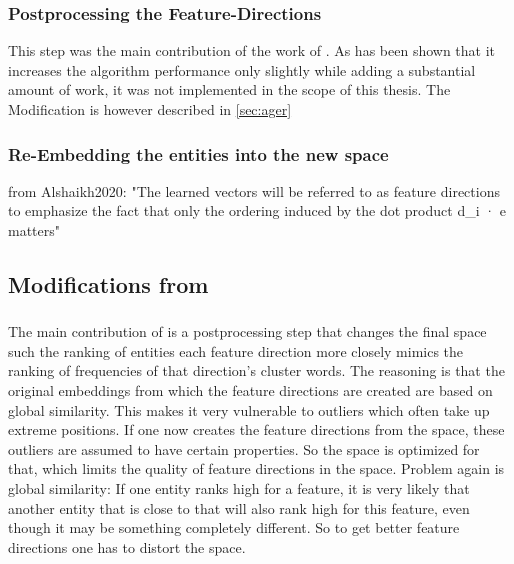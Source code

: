 \subsubsection{Postprocessing the Feature-Directions}
\label{sec:algo:postprocess}

This step was the main contribution of the work of \textcite{Ager2018}. As has been shown that it increases the algorithm performance only slightly while adding a substantial amount of work, it was not implemented in the scope of this thesis. The Modification is however described in \autoref{sec:ager}

\subsubsection{Re-Embedding the entities into the new space}
\label{sec:algo:reembed}

from Alshaikh2020: "The learned vectors will be referred to as feature directions to emphasize the fact that only the ordering induced by the dot product d_i · e matters"







\subsection{Modifications from \textcite{Ager2018,Alshaikh2020}}

\subsubsection{\textcite{Ager2018}}
\label{sec:ager}


The main contribution of \textcite{Ager2018} is a postprocessing step that changes the final space such the ranking of entities \wrt each feature direction more closely mimics the ranking of frequencies of that direction's cluster words. The reasoning is that the original embeddings from which the feature directions are created are based on global similarity. This makes it very vulnerable to outliers which often take up extreme positions. If one now creates the feature directions from the space, these outliers are assumed to have certain properties. So the space is optimized for that, which limits the quality of feature directions in the space. Problem again is global similarity: If one entity ranks high for a feature, it is very likely that another entity that is close to that will also rank high for this feature, even though it may be something completely different. So to get better feature directions one has to distort the space. 

